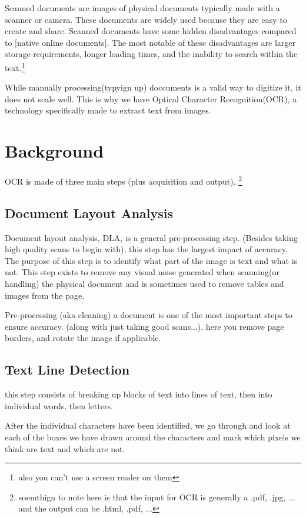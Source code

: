 \documentclass[sigplan,screen,nonacm]{acmart-tagged}
\begin{document}
Scanned documents are images of physical documents typically made with a scanner or camera. These documents are widely used because they are easy to create and share. Scanned documents have some hidden disadvantages compared to [native online documents]. The most notable of these disadvantages are larger storage requirements, longer loading times, and the inability to search within the text.\footnote{also you can't use a screen reader on them} 

While manually processing(typyign up) doccuments is a valid way to digitize it, it does not scale well. This is why we have Optical Character Recognition(OCR), a technology specifically made to extract text from images.

\section{Background}
\label{sec:background}

OCR is made of three main steps (plus acquisition and output). \footnote{soemthign to note here is that the input for OCR is generally a .pdf, .jpg, ... and the output can be .html, .pdf, ...}

\subsection{Document Layout Analysis}
\label{DLA}

Document layout analysis, DLA, is a general pre-processing step. (Besides taking high quality scans to begin with), this step has the largest impact of accuracy. The purpose of this step is to identify what part of the image is text and what is not. This step exists to remove any visual noise generated when scanning(or handling) the physical document and is sometimes used to remove tables and images from the page. 

Pre-processing (aka cleaning) a document is one of the most important steps to ensure accuracy. (along with just taking good scans...). here you remove page borders, and rotate the image if applicable. 

\subsection{Text Line Detection}
\label{TLD}

this step consists of breaking up blocks of text into lines of text, then into individual words, then letters.

After the individual characters have been identified, we go through and look at each of the boxes we have drawn around the characters and mark which pixels we think are text and which are not.
\end{document}
